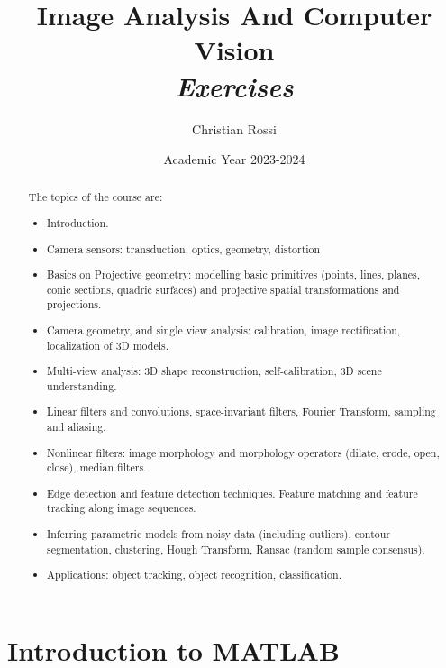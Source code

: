 \documentclass[12pt, a4paper]{report}
\title{Image Analysis And Computer Vision\\ \textit{Exercises}}
\author{Christian Rossi}
\date{Academic Year 2023-2024}
\newtheorem[style=M,bodystyle=\normalfont]{theorem}{Theorem}
\newtheorem[style=M,bodystyle=\normalfont]{corollary}{Corollary}
\newtheorem[style=M,bodystyle=\normalfont]{lemma}{Lemma}
\newtheorem[style=M,bodystyle=\normalfont]{definition}{Definition}
\begin{document}
\maketitle

\newpage

\begin{abstract}
    The topics of the course are: 
    \begin{itemize}
        \item Introduction.
        \item Camera sensors: transduction, optics, geometry, distortion
        \item Basics on Projective geometry: modelling basic primitives (points, lines, planes, conic sections, quadric surfaces) and projective spatial transformations and  projections.
        \item Camera geometry, and single view analysis: calibration, image rectification, localization of 3D models.
        \item Multi-view analysis: 3D shape reconstruction, self-calibration, 3D scene understanding.
        \item Linear filters and convolutions, space-invariant filters, Fourier Transform, sampling and aliasing. 
        \item Nonlinear filters: image morphology and morphology operators (dilate, erode, open, close), median filters.
        \item Edge detection and feature detection techniques. Feature matching and feature tracking along image sequences.
        \item Inferring parametric models from noisy data (including outliers), contour segmentation, clustering, Hough Transform, Ransac (random sample consensus). 
        \item Applications: object tracking, object recognition, classification.
    \end{itemize}
\end{abstract}

\newpage

\tableofcontents

\newpage

\chapter{Introduction to MATLAB}
\end{document}
